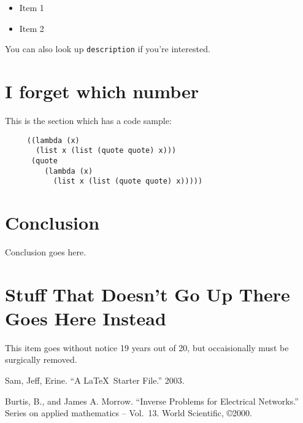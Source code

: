 \documentclass{amsart}
\theoremstyle{definition} %
\begin{document}
\begin{itemize}
 \item Item 1
 \item Item 2
\end{itemize}

You can also look up \texttt{description} if you're interested.

\section{I forget which number}

This is the section which has a code sample:

\begin{verbatim}
     ((lambda (x)
       (list x (list (quote quote) x)))
      (quote
         (lambda (x)
           (list x (list (quote quote) x)))))
\end{verbatim}


\section{Conclusion}

Conclusion goes here.

\appendix

\section{Stuff That Doesn't Go Up There Goes Here Instead}

This item goes without notice 19 years out of 20, but occaisionally
must be surgically removed.


\begin{thebibliography}{99}

Sam, Jeff, Erine.  ``A \LaTeX\ Starter File.''  2003.

Burtis, B., and James A. Morrow.  ``Inverse Problems
for Electrical Networks.''  Series on applied mathematics -- Vol.\ 13.
World Scientific, \copyright 2000.

\end{thebibliography}
\end{document}

